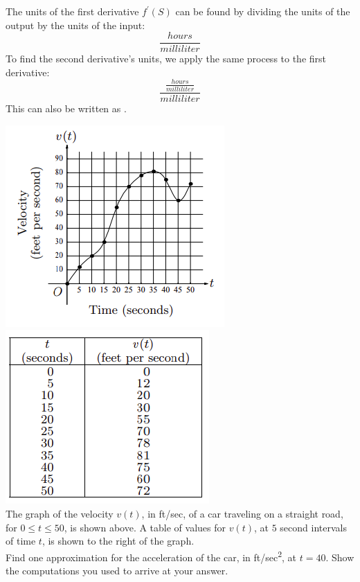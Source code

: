 \documentclass[12pt,letterpaper, onecolumn]{exam}
\begin{document}
\begin{questions}

	\begin{solution}
		The units of the first derivative $f^{\prime}(S)$ can be found by dividing the units of the output by the units of the input: 
		$$\frac{hours}{milliliter}$$
		To find the second derivative's units, we apply the same process to the first derivative:
		$$\frac{\frac{hours}{milliliter}}{milliliter}$$
		This can also be written as .
	\end{solution}

\pagebreak

\question
	\includegraphics[width=0.5\linewidth]{Question8-001}
	\includegraphics[width=0.5\linewidth]{Question8-002} \\
	The graph of the velocity $v(t)$, in ft/sec, of a car traveling on a straight road, for $0 \leq t \leq 50$, is shown above. A table of values for $v(t)$, at $5$ second intervals of time $t$, is shown to the right of the graph. \\
	Find one approximation for the acceleration of the car, in ft/sec\textsuperscript{2}, at $t = 40$. Show the computations you used to arrive at your answer.
	

\end{questions}
\end{document}

